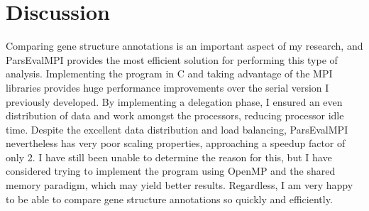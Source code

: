 \documentclass{bioinfo}
\begin{document}
\section*{Discussion}
Comparing gene structure annotations is an important aspect of my research, and ParsEvalMPI provides the most efficient solution for performing this type of analysis. Implementing the program in C and taking advantage of the MPI libraries provides huge performance improvements over the serial version I previously developed. By implementing a delegation phase, I ensured an even distribution of data and work amongst the processors, reducing processor idle time. Despite the excellent data distribution and load balancing, ParsEvalMPI nevertheless has very poor scaling properties, approaching a speedup factor of only 2. I have still been unable to determine the reason for this, but I have considered trying to implement the program using OpenMP and the shared memory paradigm, which may yield better results. Regardless, I am very happy to be able to compare gene structure annotations so quickly and efficiently.
\end{document}
